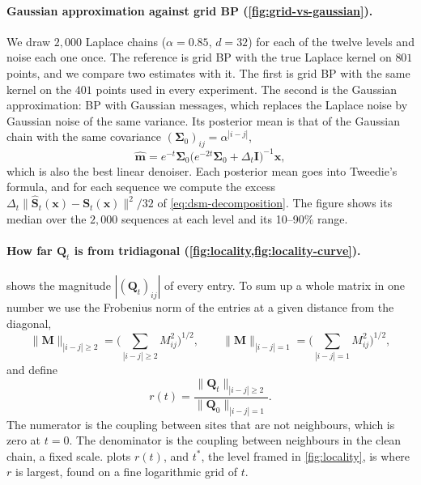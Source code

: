 \documentclass{article}
\begin{document}
\paragraph{Gaussian approximation against grid BP (\cref{fig:grid-vs-gaussian}).} We draw $2{,}000$ Laplace chains
($\alpha=0.85$, $d=32$) for each of the twelve levels and noise each one once. The reference is grid BP with the true
Laplace kernel on $801$ points, and we compare two estimates with it. The first is grid BP with the same kernel on the
$401$ points used in every experiment. The second is the Gaussian approximation: BP with Gaussian messages, which
replaces the Laplace noise by Gaussian noise of the same variance. Its posterior mean is that of the Gaussian chain with
the same covariance $(\boldsymbol\Sigma_0)_{ij}=\alpha^{|i-j|}$,
\begin{equation}
  \widehat{\mathbf m}=e^{-t}\boldsymbol\Sigma_0\big(e^{-2t}\boldsymbol\Sigma_0+\Delta_t\mathbf I\big)^{-1}\mathbf x,
\end{equation}
which is also the best linear denoiser. Each posterior mean goes into Tweedie's formula, and for each sequence we
compute the excess $\Delta_t\|\widehat{\mathbf S}_t(\mathbf x)-\mathbf S_t(\mathbf x)\|^2/32$ of
\cref{eq:dsm-decomposition}. The figure shows its median over the $2{,}000$ sequences at each level and its 10--90\%
range.

\paragraph{How far $\mathbf Q_t$ is from tridiagonal (\cref{fig:locality,fig:locality-curve}).} 
shows the magnitude $|(\mathbf Q_t)_{ij}|$ of every entry. To sum up a whole matrix in one number we use the Frobenius
norm of the entries at a given distance from the diagonal,
\begin{equation}
  \|\mathbf M\|_{|i-j|\ge2}=\Big(\sum_{|i-j|\ge2}M_{ij}^2\Big)^{1/2},
  \qquad
  \|\mathbf M\|_{|i-j|=1}=\Big(\sum_{|i-j|=1}M_{ij}^2\Big)^{1/2},
\end{equation}
and define
\begin{equation}
  r(t)=\frac{\|\mathbf Q_t\|_{|i-j|\ge2}}{\|\mathbf Q_0\|_{|i-j|=1}} .
\end{equation}
The numerator is the coupling between sites that are not neighbours, which is zero at $t=0$. The denominator is the
coupling between neighbours in the clean chain, a fixed scale.  plots $r(t)$, and $t^{*}$,
the level framed in \cref{fig:locality}, is where $r$ is largest, found on a fine logarithmic grid of $t$.
\end{document}
